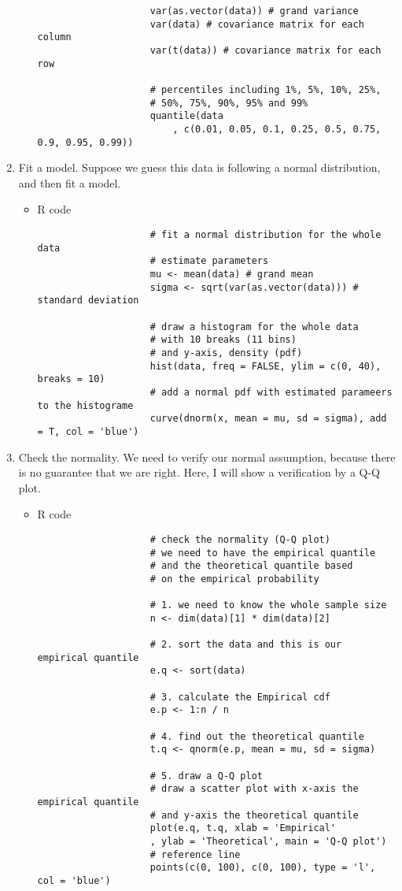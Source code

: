 \begin{enumerate}
\begin{itemize}
\begin{verbatim}
					var(as.vector(data)) # grand variance
					var(data) # covariance matrix for each column
					var(t(data)) # covariance matrix for each row
					
					# percentiles including 1%, 5%, 10%, 25%, 
					# 50%, 75%, 90%, 95% and 99%
					quantile(data 
						, c(0.01, 0.05, 0.1, 0.25, 0.5, 0.75, 0.9, 0.95, 0.99)) 
				\end{verbatim}
		\end{itemize}
	\item Fit a model. Suppose we guess this data is following a normal distribution, and then fit a model.
		\begin{itemize}
			\item R code
				\begin{verbatim}
					# fit a normal distribution for the whole data 
					# estimate parameters
					mu <- mean(data) # grand mean
					sigma <- sqrt(var(as.vector(data))) # standard deviation
					
					# draw a histogram for the whole data 
					# with 10 breaks (11 bins) 
					# and y-axis, density (pdf)
					hist(data, freq = FALSE, ylim = c(0, 40), breaks = 10)
					# add a normal pdf with estimated parameers to the histograme
					curve(dnorm(x, mean = mu, sd = sigma), add = T, col = 'blue')
				\end{verbatim}
		\end{itemize}
	\item Check the normality. We need to verify our normal assumption, because there is no guarantee that we are right. Here, I will show a verification by a Q-Q plot.
		\begin{itemize}
			\item R code
				\begin{verbatim}
					# check the normality (Q-Q plot)
					# we need to have the empirical quantile 
					# and the theoretical quantile based 
					# on the empirical probability
					
					# 1. we need to know the whole sample size
					n <- dim(data)[1] * dim(data)[2]
					
					# 2. sort the data and this is our empirical quantile
					e.q <- sort(data)
					
					# 3. calculate the Empirical cdf
					e.p <- 1:n / n
					
					# 4. find out the theoretical quantile
					t.q <- qnorm(e.p, mean = mu, sd = sigma)
					
					# 5. draw a Q-Q plot
					# draw a scatter plot with x-axis the empirical quantile 
					# and y-axis the theoretical quantile
					plot(e.q, t.q, xlab = 'Empirical'
					, ylab = 'Theoretical', main = 'Q-Q plot')
					# reference line
					points(c(0, 100), c(0, 100), type = 'l', col = 'blue')
				\end{verbatim}
		\end{itemize}
\end{enumerate}